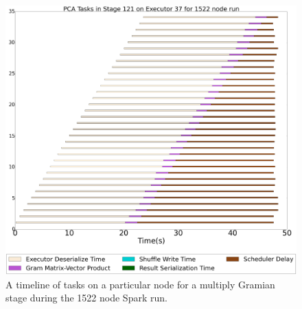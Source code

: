 




\begin{figure}[t]
\includegraphics[width=.5\textwidth]{fig/spark_pca_hero_timeline.png}
\caption{A timeline of tasks on a particular node for a multiply Gramian stage during the 1522 node Spark run. }
\label{fig:hero-timeline}
\end{figure}


